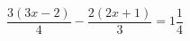 \begin{ex}[type=equation]
	\begin{condition}
		$\dfrac{3(3x - 2)}{4}-\dfrac{2(2x + 1)}{3} = 1\dfrac{1}{4}$
	\end{condition}
\end{ex}
